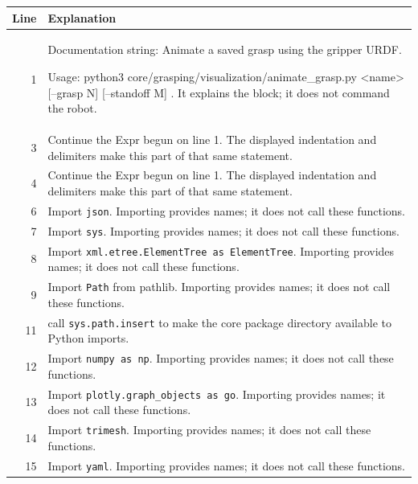 \documentclass[11pt,a4paper]{book}
\begin{document}
\begin{longtable}{r p{}}

\textbf{Line} & \textbf{Explanation} \\ \hline \endhead

1 & Documentation string: Animate a saved grasp using the gripper URDF.

Usage: python3 core/grasping/visualization/animate\_grasp.py <name> [--grasp N] [--standoff M]
. It explains the block; it does not command the robot. \\

3 & Continue the Expr begun on line 1. The displayed indentation and delimiters make this part of that same statement. \\

4 & Continue the Expr begun on line 1. The displayed indentation and delimiters make this part of that same statement. \\

6 & Import \texttt{json}. Importing provides names; it does not call these functions. \\

7 & Import \texttt{sys}. Importing provides names; it does not call these functions. \\

8 & Import \texttt{xml.etree.ElementTree as ElementTree}. Importing provides names; it does not call these functions. \\

9 & Import \texttt{Path} from pathlib. Importing provides names; it does not call these functions. \\

11 & call \texttt{sys.path.insert} to make the core package directory available to Python imports. \\

12 & Import \texttt{numpy as np}. Importing provides names; it does not call these functions. \\

13 & Import \texttt{plotly.graph\_objects as go}. Importing provides names; it does not call these functions. \\

14 & Import \texttt{trimesh}. Importing provides names; it does not call these functions. \\

15 & Import \texttt{yaml}. Importing provides names; it does not call these functions. \\


\end{longtable}
\end{document}
